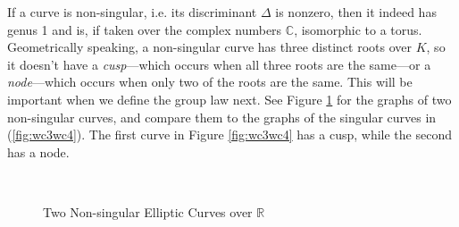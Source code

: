 If a curve is non-singular, i.e. its discriminant $\Delta$ is nonzero, then it
    indeed has genus 1 and is, if taken over the complex numbers $\mathbb{C}$,
    isomorphic to a torus.
Geometrically speaking, a non-singular curve has three distinct roots over $K$,
    so it doesn't have a \textit{cusp}---which occurs when all three roots are
    the same---or a \textit{node}---which occurs when only two of the roots are
    the same.
This will be important when we define the group law next.
See Figure \ref{fig:wc1wc2} for the graphs of two non-singular curves, and
    compare them to the graphs of the singular curves in (\ref{fig:wc3wc4}).
The first curve in Figure \ref{fig:wc3wc4} has a cusp, while the second has a
    node.

\begin{figure}[htbp]
    \mbox{
        \centering
        \qquad\qquad
    }
    \caption{Two Non-singular Elliptic Curves over $\mathbb{R}$}
    \label{fig:wc1wc2}
\end{figure}

